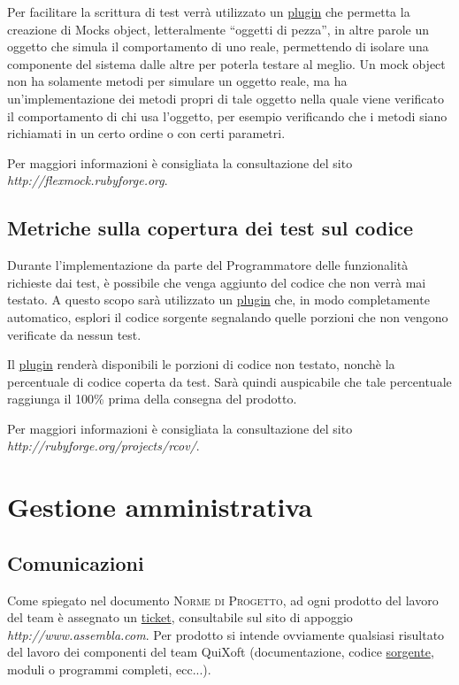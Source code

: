 \documentclass[11pt,a4paper]{article}
\begin{document}
Per facilitare la scrittura di test verrà utilizzato un \underline{plugin} che permetta la creazione di Mocks object, letteralmente ``oggetti di pezza'', in altre parole un oggetto che simula il comportamento di uno reale, permettendo di isolare una componente del sistema dalle altre per poterla testare al meglio. Un mock object non ha solamente metodi per simulare un oggetto reale, ma ha un'implementazione dei metodi propri di tale oggetto nella quale viene verificato il comportamento di chi usa l'oggetto, per esempio verificando che i metodi siano richiamati in un certo ordine o con certi parametri.

Per maggiori informazioni è consigliata la consultazione del sito \\ \textit{http://flexmock.rubyforge.org}.

\subsection{Metriche sulla copertura dei test sul codice}
Durante l'implementazione da parte del Programmatore delle funzionalità richieste dai test, è possibile che venga aggiunto del codice che non verrà mai testato. A questo scopo sarà utilizzato un \underline{plugin} che, in modo completamente automatico, esplori il codice sorgente segnalando quelle porzioni che non vengono verificate da nessun test.

Il \underline{plugin} renderà disponibili le porzioni di codice non testato, nonchè la percentuale di codice coperta da test. Sarà quindi auspicabile che tale percentuale raggiunga il 100\% prima della consegna del prodotto.

Per maggiori informazioni è consigliata la consultazione del sito \\ \textit{http://rubyforge.org/projects/rcov/}.

\section{Gestione amministrativa}
\subsection{Comunicazioni}
Come spiegato nel documento \textsc{Norme di Progetto}, ad ogni prodotto del lavoro del team è assegnato un \underline{ticket}, consultabile sul sito di appoggio \textit{http://www.assembla.com}. Per prodotto si intende ovviamente qualsiasi risultato del lavoro dei componenti del team QuiXoft (documentazione, codice \underline{sorgente}, moduli o programmi completi, ecc...).
\end{document}
